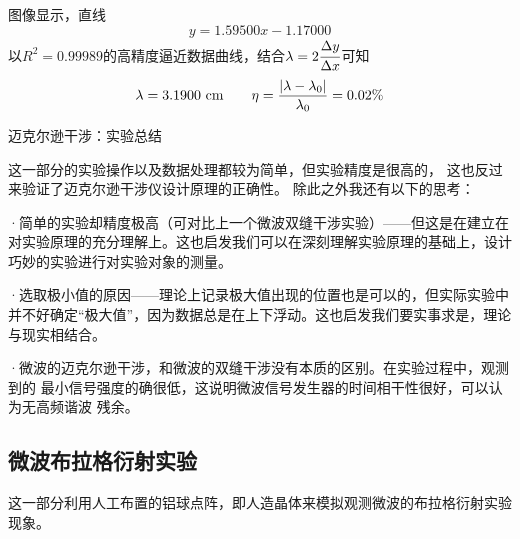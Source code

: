 \documentclass[11pt]{article}
\begin{document}
图像显示，直线\[
    y=1.59500x-1.17000
\]
以$R^2=0.99989$的高精度逼近数据曲线，结合$\lambda=2\cfrac{\Delta y}{\Delta x}$可知
\[
    \lambda=3.1900\,\,{\rm cm}\qquad \eta=\frac{|\lambda-\lambda_0|}{\lambda_0}=0.02\%
\]

\begin{center}
    \begin{tcolorbox}[colback=gray!10,%
                      colframe=black,%
                      width=5cm,%
                      arc=1mm, auto outer arc,
                      boxrule=0.5pt,
                     ]
    \begin{center}
        迈克尔逊干涉：实验总结  
    \end{center}
    \end{tcolorbox}
\end{center}

这一部分的实验操作以及数据处理都较为简单，但实验精度是很高的，
这也反过来验证了迈克尔逊干涉仪设计原理的正确性。
除此之外我还有以下的思考：

·简单的实验却精度极高（可对比上一个微波双缝干涉实验）——但这是在建立在对实验原理的充分理解上。这也启发我们可以在深刻理解实验原理的基础上，设计巧妙的实验进行对实验对象的测量。

·选取极小值的原因——理论上记录极大值出现的位置也是可以的，但实际实验中并不好确定“极大值”，因为数据总是在上下浮动。这也启发我们要实事求是，理论与现实相结合。

·微波的迈克尔逊干涉，和微波的双缝干涉没有本质的区别。在实验过程中，观测到的
最小信号强度的确很低，这说明微波信号发生器的时间相干性很好，可以认为无高频谐波
残余。



























\subsection{微波布拉格衍射实验}

这一部分利用人工布置的铝球点阵，即人造晶体来模拟观测微波的布拉格衍射实验现象。
\end{document}
